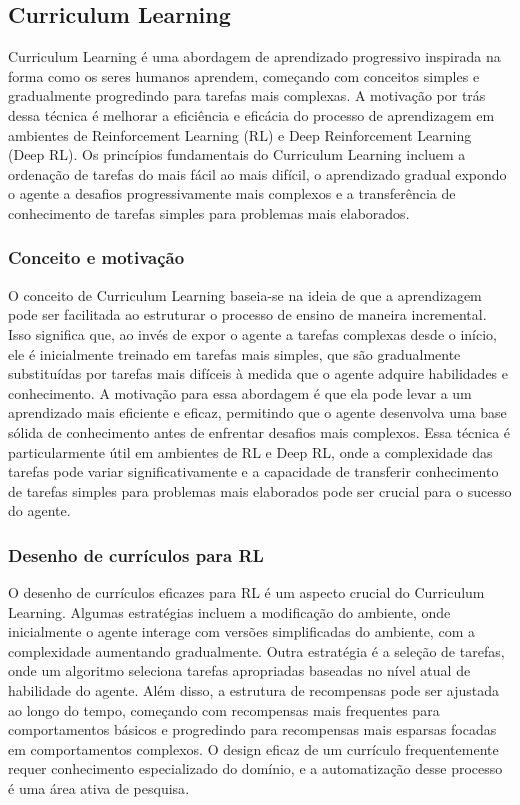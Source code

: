 \subsection{Curriculum Learning}
\label{subsec:curriculum}

Curriculum Learning é uma abordagem de aprendizado progressivo inspirada na forma como os seres humanos aprendem, começando com conceitos simples e gradualmente progredindo para tarefas mais complexas. A motivação por trás dessa técnica é melhorar a eficiência e eficácia do processo de aprendizagem em ambientes de Reinforcement Learning (RL) e Deep Reinforcement Learning (Deep RL). Os princípios fundamentais do Curriculum Learning incluem a ordenação de tarefas do mais fácil ao mais difícil, o aprendizado gradual expondo o agente a desafios progressivamente mais complexos e a transferência de conhecimento de tarefas simples para problemas mais elaborados.

\subsubsection{Conceito e motivação}
\label{subsubsec:curriculum_conceito}

O conceito de Curriculum Learning baseia-se na ideia de que a aprendizagem pode ser facilitada ao estruturar o processo de ensino de maneira incremental. Isso significa que, ao invés de expor o agente a tarefas complexas desde o início, ele é inicialmente treinado em tarefas mais simples, que são gradualmente substituídas por tarefas mais difíceis à medida que o agente adquire habilidades e conhecimento. A motivação para essa abordagem é que ela pode levar a um aprendizado mais eficiente e eficaz, permitindo que o agente desenvolva uma base sólida de conhecimento antes de enfrentar desafios mais complexos. Essa técnica é particularmente útil em ambientes de RL e Deep RL, onde a complexidade das tarefas pode variar significativamente e a capacidade de transferir conhecimento de tarefas simples para problemas mais elaborados pode ser crucial para o sucesso do agente.

\subsubsection{Desenho de currículos para RL}
\label{subsubsec:curriculum_desenho}

O desenho de currículos eficazes para RL é um aspecto crucial do Curriculum Learning. Algumas estratégias incluem a modificação do ambiente, onde inicialmente o agente interage com versões simplificadas do ambiente, com a complexidade aumentando gradualmente. Outra estratégia é a seleção de tarefas, onde um algoritmo seleciona tarefas apropriadas baseadas no nível atual de habilidade do agente. Além disso, a estrutura de recompensas pode ser ajustada ao longo do tempo, começando com recompensas mais frequentes para comportamentos básicos e progredindo para recompensas mais esparsas focadas em comportamentos complexos. O design eficaz de um currículo frequentemente requer conhecimento especializado do domínio, e a automatização desse processo é uma área ativa de pesquisa\cite{https://www.semanticscholar.org/paper/79d92c9a3e0de40d863e43232e2c00370412a841}.

